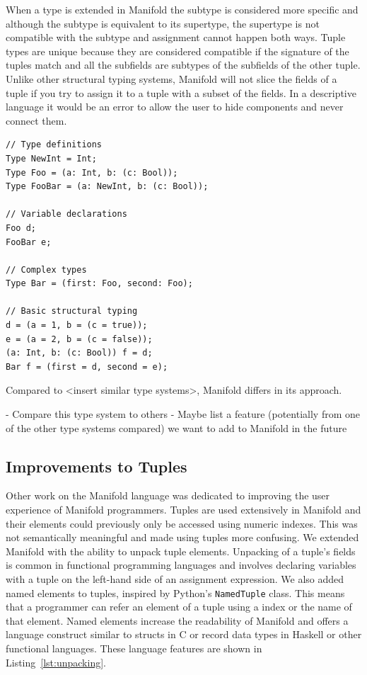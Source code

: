 When a type is extended in Manifold the subtype is considered more specific and
although the subtype is equivalent to its supertype, the supertype is not
compatible with the subtype and assignment cannot happen both ways. Tuple types
are unique because they are considered compatible if the signature of the tuples
match and all the subfields are subtypes of the subfields of the other tuple.
Unlike other structural typing systems, Manifold will not slice the fields of a
tuple if you try to assign it to a tuple with a subset of the fields. In a
descriptive language it would be an error to allow the user to hide components
and never connect them.

\begin{lstlisting}[label=lst:types,caption=Example of types in a Manifold file]
// Type definitions
Type NewInt = Int;
Type Foo = (a: Int, b: (c: Bool));
Type FooBar = (a: NewInt, b: (c: Bool));

// Variable declarations
Foo d;
FooBar e;

// Complex types
Type Bar = (first: Foo, second: Foo);

// Basic structural typing
d = (a = 1, b = (c = true));
e = (a = 2, b = (c = false));
(a: Int, b: (c: Bool)) f = d;
Bar f = (first = d, second = e);
\end{lstlisting}

Compared to <insert similar type systems>, Manifold differs in its approach.

- Compare this type system to others
- Maybe list a feature (potentially from one of the other type systems compared) we want to add to Manifold in the future

\subsection{Improvements to Tuples}

Other work on the Manifold language was dedicated to improving the user experience
of Manifold programmers. Tuples are used extensively in Manifold and their
elements could previously only be accessed using numeric indexes. This was not
semantically meaningful and made using tuples more confusing. We extended
Manifold with the ability to unpack tuple elements. Unpacking of a tuple's
fields is common in functional programming languages and involves declaring
variables with a tuple on the left-hand side of an assignment expression. We
also added named elements to tuples, inspired by Python's \texttt{NamedTuple}
class. This means that a programmer can refer an element of a tuple using a
index or the name of that element. Named elements increase the readability of
Manifold and offers a language construct similar to structs in C or record
data types in Haskell or other functional languages. These language features
are shown in Listing~\ref{lst:unpacking}.

